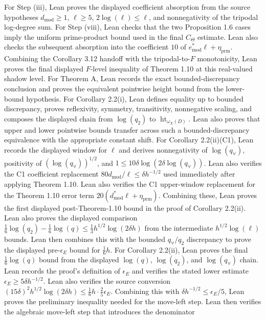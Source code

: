 \documentclass[11pt]{article}
\begin{document}
For Step (iii), Lean proves the displayed coefficient absorption from the
source hypotheses \(d_{\mathrm{mod}}\ge1\), \(\ell\ge5\), \(2\log(\ell)\le\ell\),
and nonnegativity of the tripodal log-degree sum.
For Step (viii), Lean checks that the two Proposition 1.6 cases imply the
uniform prime-product bound used in the final \(C_\Theta\) estimate.
Lean also checks the subsequent absorption into the coefficient \(10\) of
\(e^*_{\mathrm{mod}}\ell+\eta_{\mathrm{prm}}\).
Combining the Corollary 3.12 handoff with the tripodal-to-\(F\) monotonicity,
Lean proves the final displayed \(F\)-level inequality of Theorem 1.10 at this
real-valued shadow level.
For Theorem A, Lean records the exact bounded-discrepancy conclusion and proves
the equivalent pointwise height bound from the lower-bound hypothesis.
For Corollary 2.2(i), Lean defines equality up to bounded discrepancy, proves
reflexivity, symmetry, transitivity, nonnegative scaling, and composes the
displayed chain from \(\log(q_2)\) to \(\operatorname{ht}_{\omega_X(D)}\).
Lean also proves that upper and lower pointwise bounds transfer across such a
bounded-discrepancy equivalence with the appropriate constant shift.
For Corollary 2.2(ii)(C1), Lean records the displayed window for \(\ell\) and
derives nonnegativity of \(\log(q_\forall)\), positivity of
\((\log(q_\forall))^{1/2}\), and
\(1\le10\delta\log(2\delta\log(q_\forall))\).
Lean also verifies the C1 coefficient replacement
\(80d_{\mathrm{mod}}/\ell\le\delta h^{-1/2}\) used immediately after applying
Theorem 1.10.
Lean also verifies the C1 upper-window replacement for the Theorem 1.10 error
term \(20(d^*_{\mathrm{mod}}\ell+\eta_{\mathrm{prm}})\).
Combining these, Lean proves the first displayed post-Theorem-1.10 bound in the
proof of Corollary 2.2(ii).
Lean also proves the displayed comparison
\(\frac16\log(q_2)-\frac16\log(q)
\le\frac13h^{1/2}\log(2\delta h)\) from the intermediate
\(h^{1/2}\log(\ell)\) bounds.
Lean then combines this with the bounded \(q_\forall/q_2\) discrepancy to prove
the displayed pre-\(\epsilon_E\) bound for \(\frac16h\).
For Corollary 2.2(ii), Lean proves the final \(\frac16\log(q)\) bound from the
displayed \(\log(q)\), \(\log(q_2)\), and \(\log(q_\forall)\) chain.
Lean records the proof's definition of \(\epsilon_E\) and verifies the stated
lower estimate \(\epsilon_E\ge5\delta h^{-1/2}\).
Lean also verifies the source conversion
\((15\delta)^2h^{1/2}\log(2\delta h)\le\frac16h\cdot\frac25\epsilon_E\).
Combining this with \(\delta h^{-1/2}\le\epsilon_E/5\), Lean proves the
preliminary inequality needed for the move-left step.
Lean then verifies the algebraic move-left step that introduces the denominator
\end{document}
